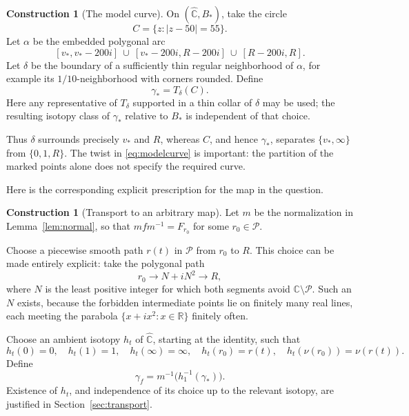 \documentclass[11pt]{article}
\newcommand{\C}{\mathbb C}
\newcommand{\Sphere}{\widehat{\mathbb C}}
\newcommand{\Par}{\mathcal P}
\theoremstyle{definition}
\newtheorem{construction}[theorem]{Construction}
\theoremstyle{remark}
\begin{document}
\begin{construction}[The model curve]\label{con:model}
On $(\Sphere,B_*)$, take the circle
\[
C=\{z:|z-50|=55\}.
\]
Let $\alpha$ be the embedded polygonal arc
\[
[v_*,v_*-200i]\ \cup\
[v_*-200i,R-200i]\ \cup\
[R-200i,R].
\]
Let $\delta$ be the boundary of a sufficiently thin regular
neighborhood of $\alpha$, for example its $1/10$-neighborhood with
corners rounded.  Define
\begin{equation}\label{eq:modelcurve}
\boxed{\ \gamma_*=T_\delta(C).\ }
\end{equation}
Here any representative of $T_\delta$ supported in a thin collar of
$\delta$ may be used; the resulting isotopy class of $\gamma_*$
relative to $B_*$ is independent of that choice.
\end{construction}

Thus $\delta$ surrounds precisely $v_*$ and $R$, whereas $C$, and hence
$\gamma_*$, separates $\{v_*,\infty\}$ from $\{0,1,R\}$.
The twist in \eqref{eq:modelcurve} is important: the partition of the
marked points alone does not specify the required curve.

Here is the corresponding explicit prescription for the map in the
question.

\begin{construction}[Transport to an arbitrary map]\label{con:general}
Let $m$ be the normalization in Lemma~\ref{lem:normal}, so that
$mfm^{-1}=F_{r_0}$ for some $r_0\in\Par$.

Choose a piecewise smooth path $r(t)$ in $\Par$ from $r_0$ to $R$.
This choice can be made entirely explicit: take the polygonal path
\[
r_0\longrightarrow N+iN^2\longrightarrow R,
\]
where $N$ is the least positive integer for which both segments avoid
$\C\setminus\Par$.  Such an $N$ exists, because the forbidden
intermediate points lie on finitely many real lines, each meeting
the parabola $\{x+ix^2:x\in\mathbb R\}$ finitely often.

Choose an ambient isotopy $h_t$ of $\Sphere$, starting at the identity,
such that
\[
h_t(0)=0,\quad h_t(1)=1,\quad h_t(\infty)=\infty,\quad
h_t(r_0)=r(t),\quad h_t(\nu(r_0))=\nu(r(t)).
\]
Define
\begin{equation}\label{eq:generalcurve}
\boxed{\ \gamma_f=m^{-1}\bigl(h_1^{-1}(\gamma_*)\bigr).\ }
\end{equation}
Existence of $h_t$, and independence of its choice up to the relevant
isotopy, are justified in Section~\ref{sec:transport}.
\end{construction}
\end{document}
